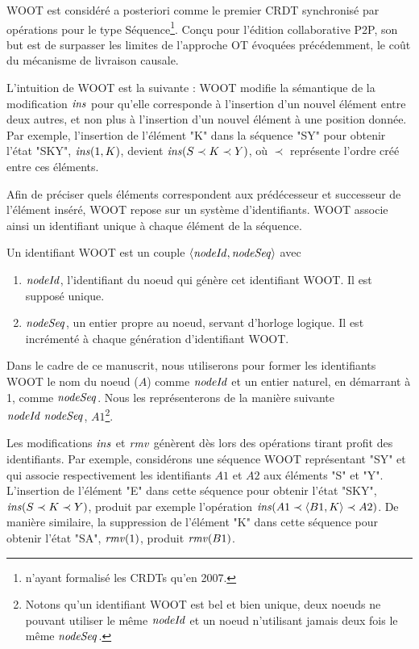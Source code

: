 WOOT \cite{2006-woot-oster} est considéré a posteriori comme le premier \ac{CRDT} synchronisé par opérations pour le type Séquence\footnote{\cite{2007-crdt-shapiro} n'ayant formalisé les \acp{CRDT} qu'en 2007.}.
Conçu pour l'édition collaborative \ac{P2P}, son but est de surpasser les limites de l'approche \ac{OT} évoquées précédemment, \ie le coût du mécanisme de livraison causale.

L'intuition de WOOT est la suivante : WOOT modifie la sémantique de la modification $\mathit{ins}$ pour qu'elle corresponde à l'insertion d'un nouvel élément entre deux autres, et non plus à l'insertion d'un nouvel élément à une position donnée.
Par exemple, l'insertion de l'élément "K" dans la séquence "SY" pour obtenir l'état "SKY", \ie $\mathit{ins}(1, K)$, devient $\mathit{ins}(S \prec K \prec Y)$, où $\prec$ représente l'ordre créé entre ces éléments.

Afin de préciser quels éléments correspondent aux prédécesseur et successeur de l'élément inséré, WOOT repose sur un système d'identifiants.
WOOT associe ainsi un identifiant unique à chaque élément de la séquence.
\begin{definition}
  \label{def:dot}
  Un identifiant WOOT est un couple $\langle \mathit{nodeId}, \mathit{nodeSeq} \rangle$ avec
  \begin{enumerate}
    \item $\mathit{nodeId}$, l'identifiant du noeud qui génère cet identifiant WOOT.
      Il est supposé unique.
    \item $\mathit{nodeSeq}$, un entier propre au noeud, servant d'horloge logique.
      Il est incrémenté à chaque génération d'identifiant WOOT.
  \end{enumerate}
\end{definition}
Dans le cadre de ce manuscrit, nous utiliserons pour former les identifiants WOOT le nom du noeud (\eg $A$) comme $\mathit{nodeId}$ et un entier naturel, en démarrant à 1, comme $\mathit{nodeSeq}$.
Nous les représenterons de la manière suivante $\mathit{nodeId}~\mathit{nodeSeq}$, \eg $A1$\footnote{Notons qu'un identifiant WOOT est bel et bien unique, deux noeuds ne pouvant utiliser le même $\mathit{nodeId}$ et un noeud n'utilisant jamais deux fois le même $\mathit{nodeSeq}$.}.

Les modifications $\mathit{ins}$ et $\mathit{rmv}$ génèrent dès lors des opérations tirant profit des identifiants.
Par exemple, considérons une séquence WOOT représentant "SY" et qui associe respectivement les identifiants $A1$ et $A2$ aux éléments "S" et "Y".
L'insertion de l'élément "E" dans cette séquence pour obtenir l'état "SKY", \ie $\mathit{ins}(S \prec K \prec Y)$, produit par exemple l'opération $\mathit{ins}(A1 \prec \langle B1,K \rangle \prec A2)$.
De manière similaire, la suppression de l'élément "K" dans cette séquence pour obtenir l'état "SA", \ie $\mathit{rmv}(1)$, produit $\mathit{rmv}(B1)$.


